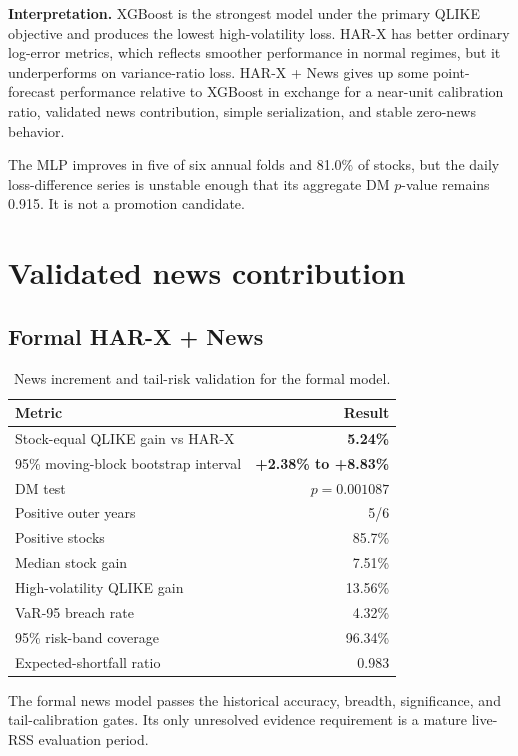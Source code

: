 \documentclass[10pt]{article}
\begin{document}
\textbf{Interpretation.}
XGBoost is the strongest model under the primary QLIKE objective and produces
the lowest high-volatility loss. HAR-X has better ordinary log-error metrics,
which reflects smoother performance in normal regimes, but it underperforms on
variance-ratio loss. HAR-X + News gives up some point-forecast performance
relative to XGBoost in exchange for a near-unit calibration ratio, validated
news contribution, simple serialization, and stable zero-news behavior.

The MLP improves in five of six annual folds and 81.0\% of stocks, but the
daily loss-difference series is unstable enough that its aggregate DM
\(p\)-value remains 0.915. It is not a promotion candidate.

\section{Validated news contribution}

\subsection{Formal HAR-X + News}

\begin{table}[ht]
\centering
\caption{News increment and tail-risk validation for the formal model.}
\begin{tabular}{lr}
\toprule
Metric & Result \\
\midrule
Stock-equal QLIKE gain vs HAR-X & \textbf{5.24\%} \\
95\% moving-block bootstrap interval & \textbf{+2.38\% to +8.83\%} \\
DM test & \(p=0.001087\) \\
Positive outer years & 5/6 \\
Positive stocks & 85.7\% \\
Median stock gain & 7.51\% \\
High-volatility QLIKE gain & 13.56\% \\
VaR-95 breach rate & 4.32\% \\
95\% risk-band coverage & 96.34\% \\
Expected-shortfall ratio & 0.983 \\
\bottomrule
\end{tabular}
\end{table}

The formal news model passes the historical accuracy, breadth, significance,
and tail-calibration gates. Its only unresolved evidence requirement is a
mature live-RSS evaluation period.
\end{document}
